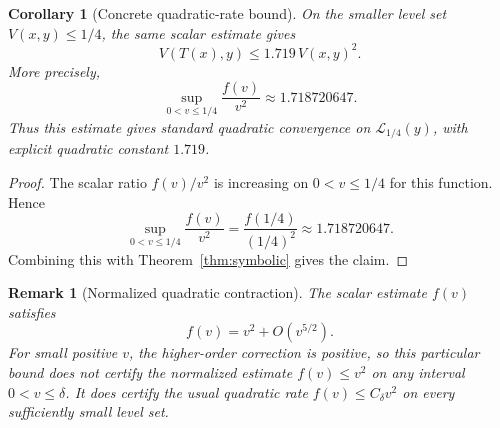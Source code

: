 \documentclass[11pt]{article}
\newtheorem{corollary}{Corollary}
\newtheorem{remark}{Remark}
\begin{document}
\begin{corollary}[Concrete quadratic-rate bound]
On the smaller level set $V(x,y)\le 1/4$, the same scalar estimate gives
\[
    V(T(x),y)
    \le
    1.719\,V(x,y)^2.
\]
More precisely,
\[
    \sup_{0<v\le1/4}\frac{f(v)}{v^2}
    \approx
    1.718720647.
\]
Thus this estimate gives standard quadratic convergence on $\mathcal L_{1/4}(y)$, with explicit quadratic constant $1.719$.
\end{corollary}

\begin{proof}
The scalar ratio $f(v)/v^2$ is increasing on $0<v\le1/4$ for this function.  Hence
\[
    \sup_{0<v\le1/4}\frac{f(v)}{v^2}
    =
    \frac{f(1/4)}{(1/4)^2}
    \approx
    1.718720647.
\]
Combining this with Theorem~\ref{thm:symbolic} gives the claim.
\end{proof}

\begin{remark}[Normalized quadratic contraction]
The scalar estimate $f(v)$ satisfies
\[
    f(v)=v^2+O(v^{5/2}).
\]
For small positive $v$, the higher-order correction is positive, so this particular bound does not certify the normalized estimate $f(v)\le v^2$ on any interval $0<v\le\delta$.  It does certify the usual quadratic rate $f(v)\le C_\delta v^2$ on every sufficiently small level set.
\end{remark}
\end{document}
